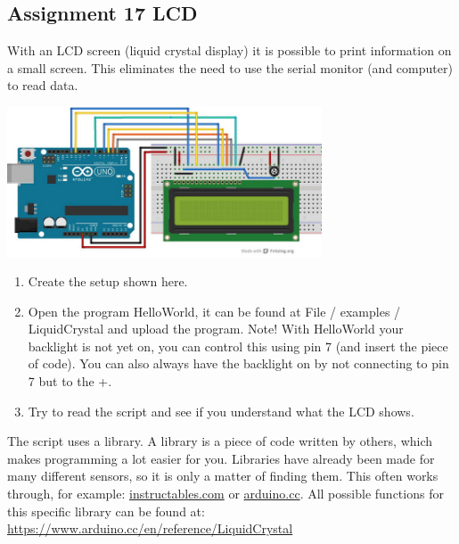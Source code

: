 \documentclass{arduino}
\begin{document}
\begin{minipage}{\widemargin}
\subsection{Assignment 17 LCD}

With an LCD screen (liquid crystal display) it is possible to print information on a small screen. This eliminates the need to use the serial monitor (and computer) to read data.\vspace{\baselineskip}

\begin{minipage}{\textwidth}
\centering
\includegraphics[width=0.7\textwidth]{37. Circuit display}
\end{minipage}

\begin{enumerate}[label={\alph*})]
\item Create the setup shown here.

\item Open the program HelloWorld, it can be found at File / examples / LiquidCrystal and upload the program. Note! With HelloWorld your backlight is not yet on, you can control this using pin 7 (and insert the piece of code). You can also always have the backlight on by not connecting to pin 7 but to the +.

\item Try to read the script and see if you understand what the LCD shows.
\end{enumerate}

The script uses a library. A library is a piece of code written by others, which makes programming a lot easier for you. Libraries have already been made for many different sensors, so it is only a matter of finding them. This often works through, for example: \href{instructables.com}{instructables.com} or \href{arduino.cc}{arduino.cc}. All possible functions for this specific library can be found at: \href{arduino.cc/en/reference/LiquidCrystal}{https://www.arduino.cc/en/reference/LiquidCrystal}


\end{minipage}
\end{document}
